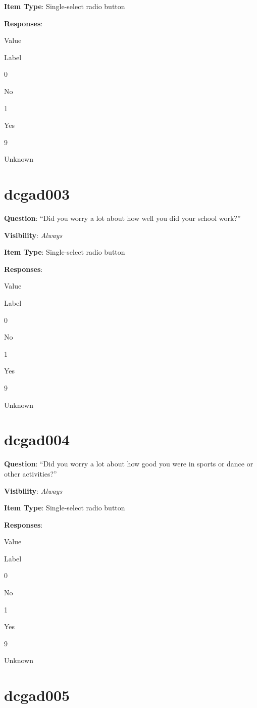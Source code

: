 \documentclass[]{book}
\begin{document}
\textbf{Item Type}: Single-select radio button

\textbf{Responses}:

Value

Label

0

No

1

Yes

9

Unknown

\hypertarget{dcgad003}{%
\section{dcgad003}\label{dcgad003}}

\textbf{Question}: ``Did you worry a lot about how well you did your school work?''

\textbf{Visibility}: \emph{Always}

\textbf{Item Type}: Single-select radio button

\textbf{Responses}:

Value

Label

0

No

1

Yes

9

Unknown

\hypertarget{dcgad004}{%
\section{dcgad004}\label{dcgad004}}

\textbf{Question}: ``Did you worry a lot about how good you were in sports or dance or other activities?''

\textbf{Visibility}: \emph{Always}

\textbf{Item Type}: Single-select radio button

\textbf{Responses}:

Value

Label

0

No

1

Yes

9

Unknown

\hypertarget{dcgad005}{%
\section{dcgad005}\label{dcgad005}}
\end{document}
